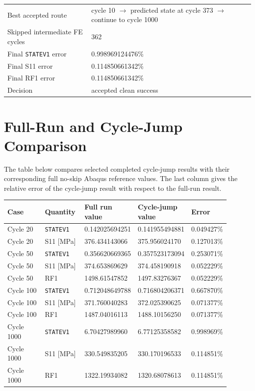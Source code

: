 \documentclass[11pt,a4paper]{article}
\begin{document}
\begin{center}
\begin{tabular}{ll}
\toprule
Best accepted route & cycle 10 $\rightarrow$ predicted state at cycle 373 $\rightarrow$ continue to cycle 1000 \\
Skipped intermediate FE cycles & 362 \\
Final \texttt{STATEV1} error & 0.998969124476\% \\
Final S11 error & 0.114850661342\% \\
Final RF1 error & 0.114850661342\% \\
Decision & accepted clean success \\
\bottomrule
\end{tabular}
\end{center}

\section{Full-Run and Cycle-Jump Comparison}

The table below compares selected completed cycle-jump results with their corresponding full no-skip Abaqus reference values. The last column gives the relative error of the cycle-jump result with respect to the full-run result.

\begin{longtable}{p{0.18\linewidth}p{0.18\linewidth}p{0.20\linewidth}p{0.20\linewidth}p{0.14\linewidth}}
\toprule
Case & Quantity & Full run value & Cycle-jump value & Error \\
\midrule
\endhead
Cycle 20 & \texttt{STATEV1} & 0.142025694251 & 0.141955494881 & 0.049427\% \\
Cycle 20 & S11 [MPa] & 376.434143066 & 375.956024170 & 0.127013\% \\
Cycle 50 & \texttt{STATEV1} & 0.356620669365 & 0.357523173094 & 0.253071\% \\
Cycle 50 & S11 [MPa] & 374.653869629 & 374.458190918 & 0.052229\% \\
Cycle 50 & RF1 & 1498.61547852 & 1497.83276367 & 0.052229\% \\
Cycle 100 & \texttt{STATEV1} & 0.712048649788 & 0.716804206371 & 0.667870\% \\
Cycle 100 & S11 [MPa] & 371.760040283 & 372.025390625 & 0.071377\% \\
Cycle 100 & RF1 & 1487.04016113 & 1488.10156250 & 0.071377\% \\
Cycle 1000 & \texttt{STATEV1} & 6.70427989960 & 6.77125358582 & 0.998969\% \\
Cycle 1000 & S11 [MPa] & 330.549835205 & 330.170196533 & 0.114851\% \\
Cycle 1000 & RF1 & 1322.19934082 & 1320.68078613 & 0.114851\% \\
\bottomrule
\end{longtable}
\end{document}
